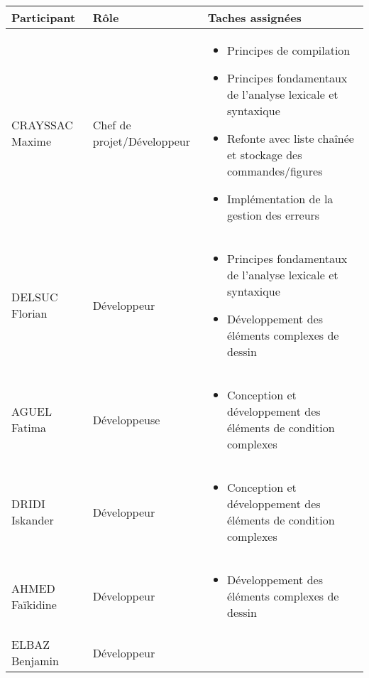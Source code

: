 \documentclass[12pt,a4paper]{article}
\begin{document}
\begin{center}
    \renewcommand{\arraystretch}{1.5}
    \begin{tabular}{|l|l|p{8cm}|}
        \hline
        \textbf{Participant} & \textbf{Rôle} & \textbf{Taches assignées} \\ \hline
        CRAYSSAC Maxime      & Chef de projet/Développeur     & 
        \begin{itemize}[noitemsep, left=0pt]
            \item Principes de compilation
            \item Principes fondamentaux de l'analyse lexicale et syntaxique
            \item Refonte avec liste chaînée et stockage des commandes/figures
            \item Implémentation de la gestion des erreurs
        \end{itemize} \\ \hline
        DELSUC Florian          & Développeur      & 
        \begin{itemize}[noitemsep, left=0pt]
            \item Principes fondamentaux de l'analyse lexicale et syntaxique
            \item Développement des éléments complexes de dessin
        \end{itemize} \\ \hline
        AGUEL Fatima          & Développeuse      & 
        \begin{itemize}[noitemsep, left=0pt]
            \item Conception et développement des éléments de condition complexes
        \end{itemize} \\ \hline
        DRIDI Iskander          & Développeur      & 
        \begin{itemize}[noitemsep, left=0pt]
            \item Conception et développement des éléments de condition complexes
        \end{itemize} \\ \hline
        AHMED Faïkidine          & Développeur      & 
        \begin{itemize}[noitemsep, left=0pt]
            \item Développement des éléments complexes de dessin
        \end{itemize} \\ \hline
        ELBAZ Benjamin          & Développeur      & 

\end{tabular}
\end{center}
\end{document}
